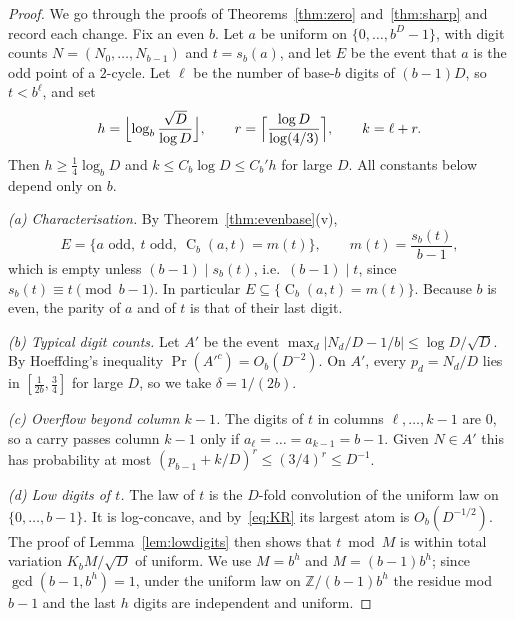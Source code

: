 \documentclass[11pt]{article}
\theoremstyle{definition}
\theoremstyle{remark}
\newcommand{\C}{\operatorname{C}}
\begin{document}
\begin{proof}
We go through the proofs of Theorems~\ref{thm:zero} and~\ref{thm:sharp}
and record each change. Fix an even $b$. Let $a$ be uniform on
$\{0,\dots,b^D-1\}$, with digit counts $N=(N_0,\dots,N_{b-1})$ and $t=s_b(a)$,
and let $E$ be the event that $a$ is the odd point of a $2$-cycle. Let $\ell$
be the number of base-$b$ digits of $(b-1)D$, so $t<b^\ell$, and set
\[
  h=\Bigl\lfloor\log_b\frac{\sqrt D}{\log D}\Bigr\rfloor,\qquad
  r=\Bigl\lceil\frac{\log D}{\log(4/3)}\Bigr\rceil,\qquad k=\ell+r .
\]
Then $h\ge\frac14\log_bD$ and $k\le C_b\log D\le C_b'h$ for large $D$. All
constants below depend only on $b$.

\emph{(a) Characterisation.} By Theorem~\ref{thm:evenbase}(v),
\[
  E=\{a\text{ odd},\ t\text{ odd},\ \C_b(a,t)=m(t)\},\qquad m(t)=\frac{s_b(t)}{b-1},
\]
which is empty unless $(b-1)\mid s_b(t)$, i.e.\ $(b-1)\mid t$, since
$s_b(t)\equiv t\pmod{b-1}$. In particular $E\subseteq\{\C_b(a,t)=m(t)\}$.
Because $b$ is even, the parity of $a$ and of $t$ is that of their last digit.

\emph{(b) Typical digit counts.} Let $A'$ be the event
$\max_d|N_d/D-1/b|\le\log D/\sqrt D$. By Hoeffding's inequality
$\Pr(A'^c)=O_b(D^{-2})$. On $A'$, every $p_d=N_d/D$ lies in
$[\frac1{2b},\frac{3}{4}]$ for large $D$, so we take $\delta=1/(2b)$.

\emph{(c) Overflow beyond column $k-1$.} The digits of $t$ in columns
$\ell,\dots,k-1$ are $0$, so a carry passes column $k-1$ only if
$a_\ell=\dots=a_{k-1}=b-1$. Given $N\in A'$ this has probability at most
$(p_{b-1}+k/D)^r\le(3/4)^r\le D^{-1}$.

\emph{(d) Low digits of $t$.} The law of $t$ is the $D$-fold convolution of the
uniform law on $\{0,\dots,b-1\}$. It is log-concave, and by~\eqref{eq:KR} its
largest atom is $O_b(D^{-1/2})$. The proof of Lemma~\ref{lem:lowdigits} then
shows that $t\bmod M$ is within total variation $K_bM/\sqrt D$ of uniform. We
use $M=b^h$ and $M=(b-1)b^h$; since $\gcd(b-1,b^h)=1$, under the uniform law
on $\mathbb Z/(b-1)b^h$ the residue mod $b-1$ and the last $h$ digits are
independent and uniform.


\end{proof}
\end{document}
